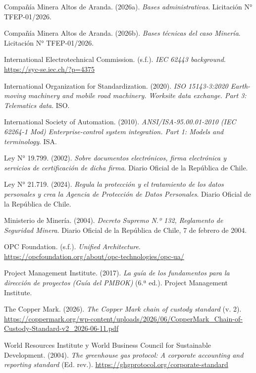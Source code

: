 \documentclass[subdoc]{../../comun/overfore}
\begin{document}
\begin{referencias}
\item Compañía Minera Altos de Aranda. (2026a). \emph{Bases administrativas}. Licitación N° TFEP-01/2026.
\item Compañía Minera Altos de Aranda. (2026b). \emph{Bases técnicas del caso Minería}. Licitación N° TFEP-01/2026.
\item International Electrotechnical Commission. (s.f.). \emph{IEC 62443 background}. \href{https://syc-se.iec.ch/?p=4375}{https://syc-se.iec.ch/?p=4375}
\item International Organization for Standardization. (2020). \emph{ISO 15143-3:2020 Earth-moving machinery and mobile road machinery. Worksite data exchange. Part 3: Telematics data}. ISO.
\item International Society of Automation. (2010). \emph{ANSI/ISA-95.00.01-2010 (IEC 62264-1 Mod) Enterprise-control system integration. Part 1: Models and terminology}. ISA.
\item Ley N° 19.799. (2002). \emph{Sobre documentos electrónicos, firma electrónica y servicios de certificación de dicha firma}. Diario Oficial de la República de Chile.
\item Ley N° 21.719. (2024). \emph{Regula la protección y el tratamiento de los datos personales y crea la Agencia de Protección de Datos Personales}. Diario Oficial de la República de Chile.
\item Ministerio de Minería. (2004). \emph{Decreto Supremo N.º 132, Reglamento de Seguridad Minera}. Diario Oficial de la República de Chile, 7 de febrero de 2004.
\item OPC Foundation. (s.f.). \emph{Unified Architecture}. \href{https://opcfoundation.org/about/opc-technologies/opc-ua/}{https://opcfoundation.org/about/opc-technologies/opc-ua/}
\item Project Management Institute. (2017). \emph{La guía de los fundamentos para la dirección de proyectos (Guía del PMBOK)} (6.ª ed.). Project Management Institute.
\item The Copper Mark. (2026). \emph{The Copper Mark chain of custody standard} (v. 2). \href{https://coppermark.org/wp-content/uploads/2026/06/CopperMark_Chain-of-Custody-Standard-v2_2026-06-11.pdf}{https://coppermark.org/wp-content/uploads/2026/06/CopperMark\_Chain-of-Custody-Standard-v2\_2026-06-11.pdf}
\item World Resources Institute y World Business Council for Sustainable Development. (2004). \emph{The greenhouse gas protocol: A corporate accounting and reporting standard} (Ed. rev.). \href{https://ghgprotocol.org/corporate-standard}{https://ghgprotocol.org/corporate-standard}
\end{referencias}
\end{document}
